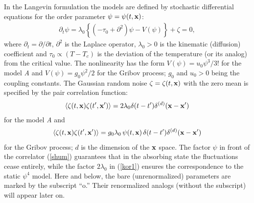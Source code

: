 \documentclass[12pt]{article}
\begin{document}
In the Langevin formulation the models are defined by stochastic
differential equations for the order parameter
$\psi = \psi(t,{\bf x})$:
\begin{eqnarray}
\partial_{t} \psi = \lambda_{0} \left\{ (-\tau_{0} +
\partial^{2}) \psi - V(\psi) \right\} + \zeta  = 0,
\label{stoh}
\end{eqnarray}
where $\partial_{t}= \partial/ \partial t$, $\partial^{2}$ is the
Laplace operator, $\lambda_{0}>0$ is the kinematic (diffusion)
coefficient and $\tau_{0} \propto (T-T_{c})$ is the deviation of
the temperature (or its analog) from the critical value. The
nonlinearity has the form $V(\psi)=u_{0} \psi^{3}/3!$ for the model {\it A}
and $V(\psi)=g_{0} \psi^{2}/2$ for the Gribov process; $g_{0}$ and
$u_{0}>0$ being the coupling constants. The Gaussian random noise
$\zeta=\zeta(t,{\bf x})$ with the zero mean is specified by the
pair correlation function:
\begin{eqnarray}
\langle \zeta (t,{\bf x})\zeta (t',{\bf x'}) \rangle =
2 \lambda_{0}  \delta(t-t')\delta^{(d)}({\bf x}-{\bf x}')
\label{kor1}
\end{eqnarray}
for the model {\it A} and
\begin{equation}
\langle \zeta (t,{\bf x})\zeta (t',{\bf x'}) \rangle = g_{0}\lambda_{0}\,
\psi(t,{\bf x})\,   \delta(t-t')\delta^{(d)}({\bf x}-{\bf x}')
\label{shum}
\end{equation}
for the Gribov process; $d$ is the dimension of the ${\bf x}$ space. The
factor $\psi$ in front of the correlator (\ref{shum}) guarantees that in the
absorbing state the fluctuations cease entirely, while the factor
$2\lambda_{0}$ in (\ref{kor1}) ensures the correspondence to the static
$\psi^{4}$ model. Here and below, the bare (unrenormalized) parameters are
marked by the subscript ``o.'' Their renormalized analogs (without
the subscript) will appear later on.
\end{document}
